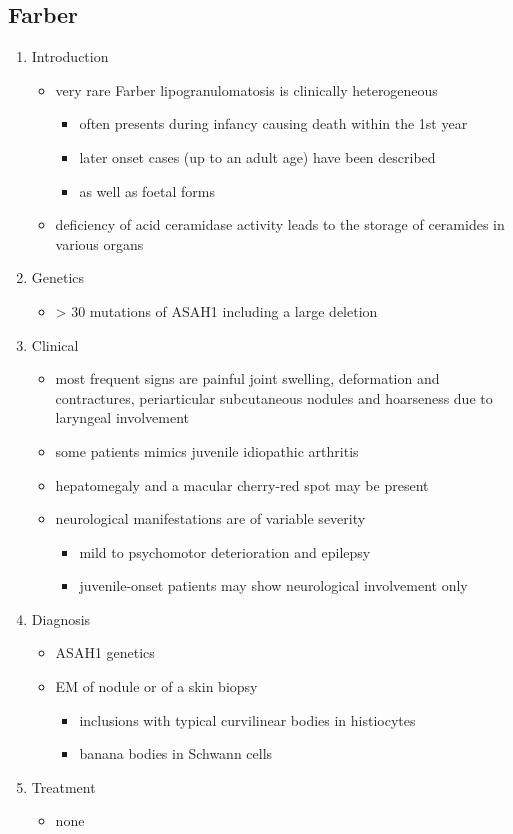 \documentclass{scrartcl}
\begin{document}
\subsection{Farber}
\label{sec:org85613ad}
\begin{enumerate}
\item Introduction
\label{sec:org2300d0a}
\begin{itemize}
\item very rare Farber lipogranulomatosis is clinically heterogeneous
\begin{itemize}
\item often presents during infancy causing death within the 1st year
\item later onset cases (up to an adult age) have been described
\item as well as foetal forms
\end{itemize}
\item deficiency of acid ceramidase activity leads to the storage of
ceramides in various organs
\end{itemize}
\item Genetics
\label{sec:orgc06e3d5}
\begin{itemize}
\item \textgreater{} 30 mutations of ASAH1 including a large deletion
\end{itemize}
\item Clinical
\label{sec:org3aca99b}
\begin{itemize}
\item most frequent signs are painful joint swelling, deformation and contractures, periarticular subcutaneous nodules and hoarseness due to laryngeal involvement
\item some patients mimics juvenile idiopathic arthritis
\item hepatomegaly and a macular cherry-red spot may be present
\item neurological manifestations are of variable severity
\begin{itemize}
\item mild to psychomotor deterioration and epilepsy
\item juvenile-onset patients may show neurological involvement only
\end{itemize}
\end{itemize}

\item Diagnosis
\label{sec:orgd56d4f9}
\begin{itemize}
\item ASAH1 genetics
\item EM of nodule or of a skin biopsy
\begin{itemize}
\item inclusions with typical curvilinear bodies in histiocytes
\item banana bodies in Schwann cells
\end{itemize}
\end{itemize}

\item Treatment
\label{sec:org1ca7f87}
\begin{itemize}
\item none
\end{itemize}
\end{enumerate}
\end{document}
